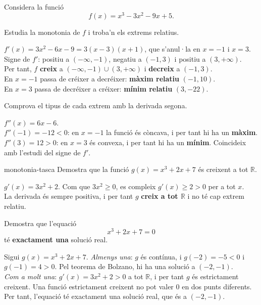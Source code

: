 Considera la funció
\[
f(x)=x^3-3x^2-9x+5 .
\]

\begin{apartats}

Estudia la monotonia de $f$ i troba'n els extrems relatius.

\begin{solucio}
$f'(x)=3x^2-6x-9=3(x-3)(x+1)$, que s'anul·la en $x=-1$ i $x=3$.\\
Signe de $f'$: positiu a $(-\infty,-1)$, negatiu a $(-1,3)$ i positiu a $(3,+\infty)$.\\
Per tant, $f$ \textbf{creix} a $(-\infty,-1)\cup(3,+\infty)$ i \textbf{decreix} a $(-1,3)$.\\
En $x=-1$ passa de créixer a decréixer: \textbf{màxim relatiu} $(-1,10)$.\\
En $x=3$ passa de decréixer a créixer: \textbf{mínim relatiu} $(3,-22)$.
\end{solucio}

\begin{nomesllarg}
Comprova el tipus de cada extrem amb la derivada segona.

\begin{solucio}
$f''(x)=6x-6$.\\
$f''(-1)=-12<0$: en $x=-1$ la funció és còncava, i per tant hi ha un \textbf{màxim}.\\
$f''(3)=12>0$: en $x=3$ és convexa, i per tant hi ha un \textbf{mínim}. Coincideix amb
l'estudi del signe de $f'$.
\end{solucio}
\end{nomesllarg}

\begin{tria}{monotonia-tasca}
Demostra que la funció $g(x)=x^3+2x+7$ és creixent a tot $\mathbb{R}$.

\begin{solucio}
$g'(x)=3x^2+2$. Com que $3x^2\ge0$, es compleix $g'(x)\ge2>0$ per a tot $x$.\\
La derivada és sempre positiva, i per tant $g$ \textbf{creix a tot $\mathbb{R}$} i no té cap
extrem relatiu.
\end{solucio}

Demostra que l'equació
\[
x^3+2x+7=0
\]
té \textbf{exactament una} solució real.

\begin{solucio}
Sigui $g(x)=x^3+2x+7$. \emph{Almenys una}: $g$ és contínua, i $g(-2)=-5<0$ i $g(-1)=4>0$. Pel
teorema de Bolzano, hi ha una solució a $(-2,-1)$.\\
\emph{Com a molt una}: $g'(x)=3x^2+2>0$ a tot $\mathbb{R}$, i per tant $g$ és estrictament
creixent. Una funció estrictament creixent no pot valer $0$ en dos punts diferents.\\
Per tant, l'equació té exactament una solució real, que és a $(-2,-1)$.
\end{solucio}
\end{tria}

\end{apartats}
